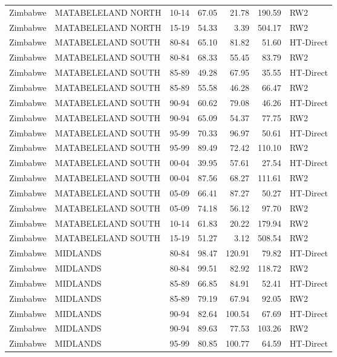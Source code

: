 \begin{longtable}{lllrrrl}
  Zimbabwe & MATABELELAND NORTH & 10-14 & 67.05 & 21.78 & 190.59 & RW2 \\ 
  Zimbabwe & MATABELELAND NORTH & 15-19 & 54.33 & 3.39 & 504.17 & RW2 \\ 
  Zimbabwe & MATABELELAND SOUTH & 80-84 & 65.10 & 81.82 & 51.60 & HT-Direct \\ 
  Zimbabwe & MATABELELAND SOUTH & 80-84 & 68.33 & 55.45 & 83.79 & RW2 \\ 
  Zimbabwe & MATABELELAND SOUTH & 85-89 & 49.28 & 67.95 & 35.55 & HT-Direct \\ 
  Zimbabwe & MATABELELAND SOUTH & 85-89 & 55.58 & 46.28 & 66.47 & RW2 \\ 
  Zimbabwe & MATABELELAND SOUTH & 90-94 & 60.62 & 79.08 & 46.26 & HT-Direct \\ 
  Zimbabwe & MATABELELAND SOUTH & 90-94 & 65.09 & 54.37 & 77.75 & RW2 \\ 
  Zimbabwe & MATABELELAND SOUTH & 95-99 & 70.33 & 96.97 & 50.61 & HT-Direct \\ 
  Zimbabwe & MATABELELAND SOUTH & 95-99 & 89.49 & 72.42 & 110.10 & RW2 \\ 
  Zimbabwe & MATABELELAND SOUTH & 00-04 & 39.95 & 57.61 & 27.54 & HT-Direct \\ 
  Zimbabwe & MATABELELAND SOUTH & 00-04 & 87.56 & 68.27 & 111.61 & RW2 \\ 
  Zimbabwe & MATABELELAND SOUTH & 05-09 & 66.41 & 87.27 & 50.27 & HT-Direct \\ 
  Zimbabwe & MATABELELAND SOUTH & 05-09 & 74.18 & 56.12 & 97.70 & RW2 \\ 
  Zimbabwe & MATABELELAND SOUTH & 10-14 & 61.83 & 20.22 & 179.94 & RW2 \\ 
  Zimbabwe & MATABELELAND SOUTH & 15-19 & 51.27 & 3.12 & 508.54 & RW2 \\ 
  Zimbabwe & MIDLANDS & 80-84 & 98.47 & 120.91 & 79.82 & HT-Direct \\ 
  Zimbabwe & MIDLANDS & 80-84 & 99.51 & 82.92 & 118.72 & RW2 \\ 
  Zimbabwe & MIDLANDS & 85-89 & 66.85 & 84.91 & 52.41 & HT-Direct \\ 
  Zimbabwe & MIDLANDS & 85-89 & 79.19 & 67.94 & 92.05 & RW2 \\ 
  Zimbabwe & MIDLANDS & 90-94 & 82.64 & 100.54 & 67.69 & HT-Direct \\ 
  Zimbabwe & MIDLANDS & 90-94 & 89.63 & 77.53 & 103.26 & RW2 \\ 
  Zimbabwe & MIDLANDS & 95-99 & 80.85 & 100.77 & 64.59 & HT-Direct \\ 

\end{longtable}
